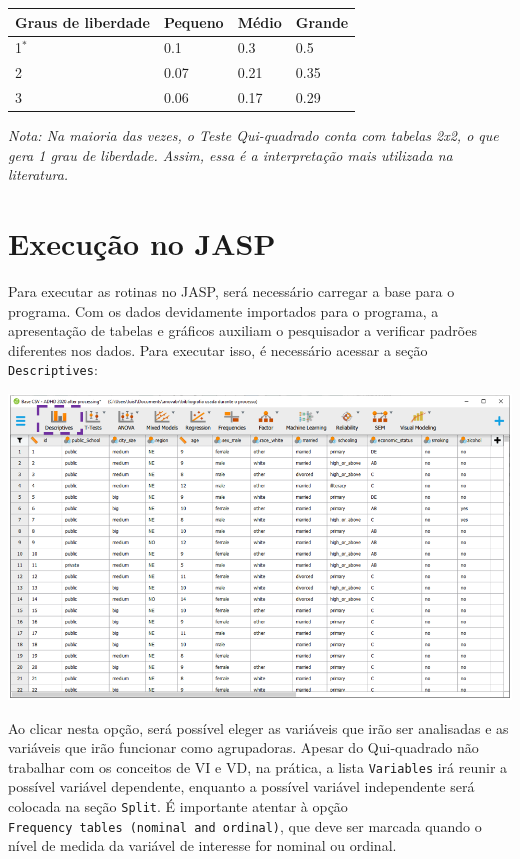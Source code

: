 \documentclass[
]{book}
\begin{document}
\begin{longtable}[]{@{}llll@{}}
\toprule
Graus de liberdade & Pequeno & Médio & Grande \\
\midrule
\endhead
1\(^*\) & 0.1 & 0.3 & 0.5 \\
2 & 0.07 & 0.21 & 0.35 \\
3 & 0.06 & 0.17 & 0.29 \\
\bottomrule
\end{longtable}

\emph{Nota: Na maioria das vezes, o Teste Qui-quadrado conta com tabelas 2x2, o que gera 1 grau de liberdade. Assim, essa é a interpretação mais utilizada na literatura.}

\hypertarget{execuuxe7uxe3o-no-jasp-1}{%
\section{Execução no JASP}\label{execuuxe7uxe3o-no-jasp-1}}

Para executar as rotinas no JASP, será necessário carregar a base para o programa. Com os dados devidamente importados para o programa, a apresentação de tabelas e gráficos auxiliam o pesquisador a verificar padrões diferentes nos dados. Para executar isso, é necessário acessar a seção \texttt{Descriptives}:

\includegraphics{./img/cap_x2_tela_inicial.png}

Ao clicar nesta opção, será possível eleger as variáveis que irão ser analisadas e as variáveis que irão funcionar como agrupadoras. Apesar do Qui-quadrado não trabalhar com os conceitos de VI e VD, na prática, a lista \texttt{Variables} irá reunir a possível variável dependente, enquanto a possível variável independente será colocada na seção \texttt{Split}. É importante atentar à opção \texttt{Frequency\ tables\ (nominal\ and\ ordinal)}, que deve ser marcada quando o nível de medida da variável de interesse for nominal ou ordinal.
\end{document}
